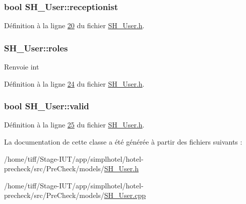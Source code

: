 \hypertarget{classSH__User_ad9970fff1a6be03101fd87f9c60081ee}{
\subsubsection[{receptionist}]{\setlength{\rightskip}{0pt plus 5cm}bool S\-H\-\_\-\-User\-::receptionist\hspace{0.3cm}{\ttfamily [read]}}}\label{classSH__User_ad9970fff1a6be03101fd87f9c60081ee}


Définition à la ligne \hyperlink{SH__User_8h_source_l00020}{20} du fichier \hyperlink{SH__User_8h_source}{S\-H\-\_\-\-User.\-h}.

\hypertarget{classSH__User_af21eafacfa21aa325f7e68a065ce14de}{
\subsubsection[{roles}]{\setlength{\rightskip}{0pt plus 5cm}S\-H\-\_\-\-User\-::roles\hspace{0.3cm}{\ttfamily [read]}}}\label{classSH__User_af21eafacfa21aa325f7e68a065ce14de}
\begin{DoxyReturn}{Renvoie}
int 
\end{DoxyReturn}


Définition à la ligne \hyperlink{SH__User_8h_source_l00024}{24} du fichier \hyperlink{SH__User_8h_source}{S\-H\-\_\-\-User.\-h}.

\hypertarget{classSH__User_a91cae1175894bf2eef629405638db01c}{
\subsubsection[{valid}]{\setlength{\rightskip}{0pt plus 5cm}bool S\-H\-\_\-\-User\-::valid\hspace{0.3cm}{\ttfamily [read]}}}\label{classSH__User_a91cae1175894bf2eef629405638db01c}


Définition à la ligne \hyperlink{SH__User_8h_source_l00025}{25} du fichier \hyperlink{SH__User_8h_source}{S\-H\-\_\-\-User.\-h}.



La documentation de cette classe a été générée à partir des fichiers suivants \-:\begin{DoxyCompactItemize}
\item 
/home/tiff/\-Stage-\/\-I\-U\-T/app/simplhotel/hotel-\/precheck/src/\-Pre\-Check/models/\hyperlink{SH__User_8h}{S\-H\-\_\-\-User.\-h}\item 
/home/tiff/\-Stage-\/\-I\-U\-T/app/simplhotel/hotel-\/precheck/src/\-Pre\-Check/models/\hyperlink{SH__User_8cpp}{S\-H\-\_\-\-User.\-cpp}\end{DoxyCompactItemize}
